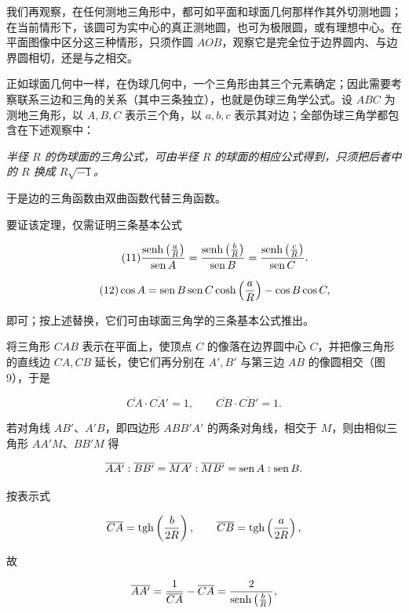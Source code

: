我们再观察，在任何测地三角形中，都可如平面和球面几何那样作其外切测地圆；在当前情形下，该圆可为实中心的真正测地圆，也可为极限圆，或有理想中心。在平面图像中区分这三种情形，只须作圆 $AOB$，观察它是完全位于边界圆内、与边界圆相切，还是与之相交。



正如球面几何中一样，在伪球几何中，一个三角形由其三个元素确定；因此需要考察联系三边和三角的关系（其中三条独立），也就是伪球三角学公式。设 \(ABC\) 为测地三角形，以 \(A,B,C\) 表示三个角，以 \(a,b,c\) 表示其对边；全部伪球三角学都包含在下述观察中：



\emph{半径 $R$ 的伪球面的三角公式，可由半径 $R$ 的球面的相应公式得到，只须把后者中的 $R$ 换成 $R\sqrt{-1}$。}



于是边的三角函数由双曲函数代替三角函数。



要证该定理，仅需证明三条基本公式

\[
\tag{11}
 \frac{\operatorname{senh}\left(\frac aR\right)}{\operatorname{sen} A}=\frac{\operatorname{senh}\left(\frac bR\right)}{\operatorname{sen} B}=\frac{\operatorname{senh}\left(\frac cR\right)}{\operatorname{sen} C}.
\]

\[
\tag{12}
 \cos A=\operatorname{sen} B\operatorname{sen} C\cosh\left(\frac aR\right)-\cos B\cos C,
\]

即可；按上述替换，它们可由球面三角学的三条基本公式推出。



将三角形 \(CAB\) 表示在平面上，使顶点 \(C\) 的像落在边界圆中心 \(C\)，并把像三角形的直线边 \(CA,CB\) 延长，使它们再分别在 \(A',B'\) 与第三边 \(AB\) 的像圆相交（图9），于是

\[
 \overline{CA}\cdot\overline{CA'}=1,
 \qquad
 \overline{CB}\cdot\overline{CB'}=1.
\]



\fignine



若对角线 \(AB'\)、\(A'B\)，即四边形 \(ABB'A'\) 的两条对角线，相交于 \(M\)，则由相似三角形 \(AA'M\)、\(BB'M\) 得

\[
 \overline{AA'}:\overline{BB'}=\overline{MA'}:\overline{MB'}=\operatorname{sen} A:\operatorname{sen} B.
\]

按表示式

\[
 \overline{CA}=\operatorname{tgh}\left(\frac b{2R}\right),\qquad
 \overline{CB}=\operatorname{tgh}\left(\frac a{2R}\right),
\]

故

\[
 \overline{AA'}=\frac1{\overline{CA}}-\overline{CA}=\frac{2}{\operatorname{senh}\left(\frac bR\right)},
\]

